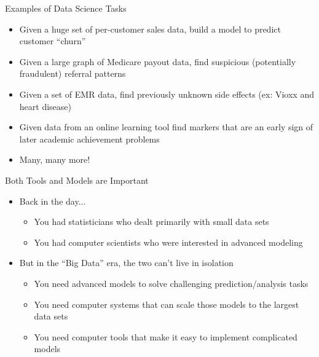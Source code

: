\documentclass[aspectratio=169]{beamer}
\begin{document}
\begin{frame}{Examples of Data Science Tasks}

\begin{itemize}
\item Given a huge set of per-customer sales data, build a model to predict customer ``churn''
\item Given a large graph of Medicare payout data, find suspicious (potentially fraudulent) referral patterns
\item Given a set of EMR data, find previously unknown side effects (ex: Vioxx and heart disease)
\item Given data from an online learning tool find markers that are an early sign of later academic achievement problems
\item Many, many more!
\end{itemize}
\end{frame}


\begin{frame}{Both Tools and Models are Important}
    \begin{itemize}
\item Back in the day...
	\begin{itemize}
	\item You had statisticians who dealt primarily with small data sets
	\item You had computer scientists who were interested in advanced modeling
	\end{itemize}
\item But in the ``Big Data'' era, the two can't live in isolation
	\begin{itemize}
	\item You need advanced models to solve challenging prediction/analysis tasks 
	\item You need computer systems that can scale those models to the largest data sets
	\item You need computer tools that make it easy to implement complicated models
	\end{itemize}
    \end{itemize}

\end{frame}
\end{document}
